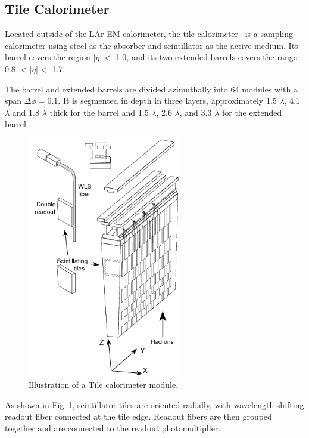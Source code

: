 \subsection{Tile Calorimeter}
\par Located outside of the LAr EM calorimeter, the tile calorimeter~\cite{CERN-LHCC-96-042} is a sampling calorimeter using steel 
as the absorber and scintillator as the active medium. Its barrel covers the region $|\eta| <$ 1.0, and its two extended barrels covers the range 0.8 $< |\eta| <$ 1.7.
\par The barrel and extended barrels are divided azimuthally into 64 modules with a span $\Delta \phi = 0.1$. 
It is segmented in depth in three layers, 
approximately 1.5 $\lambda$, 4.1 $\lambda$ and 1.8 $\lambda$ thick for the barrel and 1.5 $\lambda$, 2.6 $\lambda$, and 3.3 $\lambda$ 
for the extended barrel. 
\begin{figure}[htbp!]
 \begin{center}
 \includegraphics[width=0.6\textwidth]{chapters/c4/figures/tile}

 \end{center}
 \caption{Illustration of a Tile calorimeter module.}
 \label{fig:Tile}
\end{figure}
\par As shown in Fig~\ref{fig:Tile}, scintillator tiles are oriented radially, with wavelength-shifting readout fiber connected at the tile edge. 
Readout fibers are then grouped together and are connected to the readout photomultiplier.

